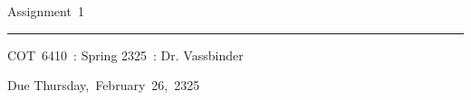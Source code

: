 \documentclass[fleqn]{article}
\newcommand{\myCourse}{COT\ 6410}
\newcommand{\mySection}{Spring 2325}
\newcommand{\myTeacher}{Dr. Vassbinder}
\newcommand{\myAssignment}{Assignment~1}
\newcommand{\myDueDate}{Thursday,\ February\ 26,\ 2325}
\begin{document}
\title{\vspace{-1in}} %
\author{} %
\date{} %
\maketitle %

\usebox{\myTitleSignature}
\vspace{1in} %

{\centering \huge \myAssignment \par}
{\centering \noindent\rule{4in}{0.1pt} \par}
\vspace{0.05in}
{\centering \myCourse~: \mySection~: \myTeacher \par}
{\centering Due \myDueDate \par}
\vspace{1in}

\tableofcontents
\newpage

\end{document}
